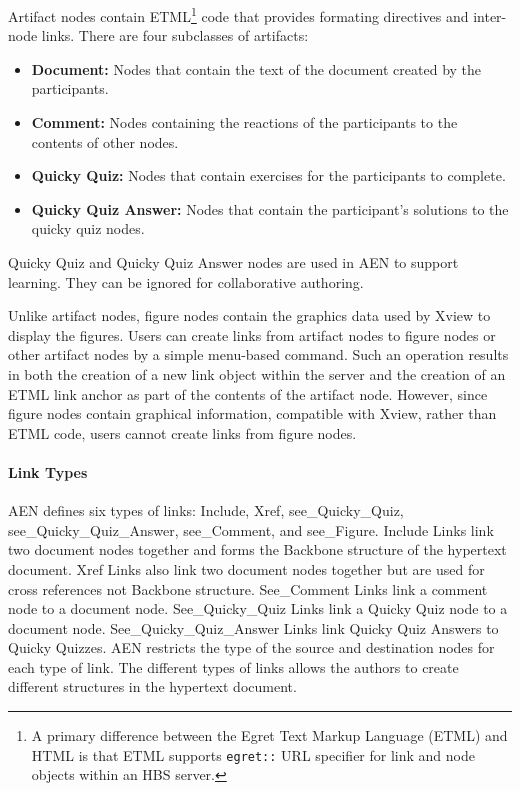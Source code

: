 Artifact nodes contain ETML\footnote{A primary difference between the Egret
Text Markup Language (ETML) and HTML is that ETML supports {\tt egret::}
URL specifier for link and node objects within an HBS server.} code that
provides formating directives and inter-node links.  There are four
subclasses of artifacts:

\begin{itemize}

\item{\bf Document:} Nodes that contain the text of the document created by
the participants.

\item{\bf Comment:} Nodes containing the reactions of the participants to
the contents of other nodes.

\item{\bf Quicky Quiz:} Nodes that contain exercises for the participants
to complete.

\item{\bf Quicky Quiz Answer:} Nodes that contain the participant's
solutions to the quicky quiz nodes.

\end{itemize}

Quicky Quiz and Quicky Quiz Answer nodes are used in AEN to support
learning.  They can be ignored for collaborative authoring.


Unlike artifact nodes, figure nodes contain the graphics data used by Xview
to display the figures.  Users can create links from artifact nodes to
figure nodes or other artifact nodes by a simple menu-based command.  Such
an operation results in both the creation of a new link object within the
server and the creation of an ETML link anchor as part of the contents of
the artifact node.  However, since figure nodes contain graphical
information, compatible with Xview, rather than ETML code, users cannot
create links from figure nodes. %

\paragraph{Link Types}

AEN defines six types of links: Include, Xref, see\_Quicky\_\-Quiz,
see\_\-Quicky\_\-Quiz\_\-Answer, see\_\-Comment, and see\_Figure.  Include
Links link two document nodes together and forms the Backbone structure of
the hypertext document.  Xref Links also link two document nodes together
but are used for cross references not Backbone structure.  See\_Comment
Links link a comment node to a document node.  See\_Quicky\_Quiz Links link
a Quicky Quiz node to a document node.  See\_Quicky\_Quiz\_Answer Links
link Quicky Quiz Answers to Quicky Quizzes.  AEN restricts the type of the
source and destination nodes for each type of link.  The different types of
links allows the authors to create different
structures in the hypertext document. 


